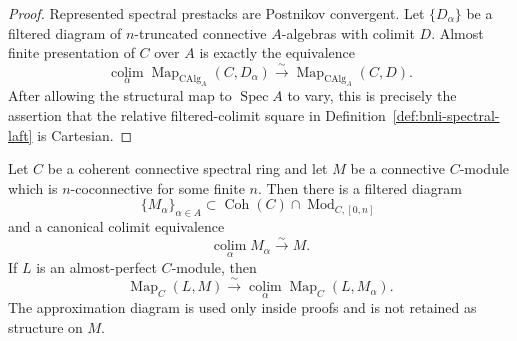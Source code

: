 \begin{proof}
Represented spectral prestacks are Postnikov convergent.  Let
$\{D_\alpha\}$ be a filtered diagram of $n$-truncated connective
$A$-algebras with colimit $D$.  Almost finite presentation of $C$ over $A$
is exactly the equivalence
\[
    \operatorname*{colim}_\alpha
    \operatorname{Map}_{\operatorname{CAlg}_A}(C,D_\alpha)
    \xrightarrow{\sim}
    \operatorname{Map}_{\operatorname{CAlg}_A}(C,D).
\]
After allowing the structural map to $\operatorname{Spec}A$ to vary, this is
precisely the assertion that the relative filtered-colimit square in
Definition~\ref{def:bnli-spectral-laft} is Cartesian.
\end{proof}

\begin{lemma}
\label{lem:bnli-bounded-coherent-approximation}
Let $C$ be a coherent connective spectral ring and let $M$ be a connective
$C$-module which is $n$-coconnective for some finite $n$.  Then there is a
filtered diagram
\[
    \{M_\alpha\}_{\alpha\in A}
    \subset
    \operatorname{Coh}(C)\cap\operatorname{Mod}_{C,[0,n]}
\]
and a canonical colimit equivalence
\[
\boxed{
    \operatorname*{colim}_{\alpha}M_\alpha
    \xrightarrow{\sim}
    M.}
\]
If $L$ is an almost-perfect $C$-module, then
\[
\boxed{
    \operatorname{Map}_C(L,M)
    \xrightarrow{\sim}
    \operatorname*{colim}_{\alpha}
    \operatorname{Map}_C(L,M_\alpha).}
\]
The approximation diagram is used only inside proofs and is not retained as
structure on $M$.
\end{lemma}

